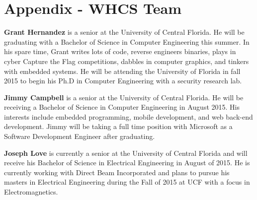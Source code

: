 \section{Appendix - WHCS Team}

\textbf{Grant Hernandez} is a senior at the University of Central Florida. He will be
graduating with a Bachelor of Science in Computer Engineering this summer. In
his spare time, Grant writes lots of code, reverse engineers binaries, plays in cyber
Capture the Flag competitions, dabbles in computer graphics, and tinkers with
embedded systems. He will be attending the University of Florida in fall 2015
to begin his Ph.D in Computer Engineering with a security research lab.


\textbf{Jimmy Campbell} is a senior at the University of Central Florida. He will be
receiving a Bachelor of Science in Computer Engineering in August 2015. His
interests include embedded programming, mobile development, and web back-end
development. Jimmy will be taking a full time position with Microsoft as a
Software Development Engineer after graduating.


\textbf{Joseph Love} is currently a senior at the University of Central Florida and will
receive his Bachelor of Science in Electrical Engineering in August of 2015. He
is currently working with Direct Beam Incorporated and plans to pursue his
masters in Electrical Engineering during the Fall of 2015 at UCF with a focus
in Electromagnetics.
